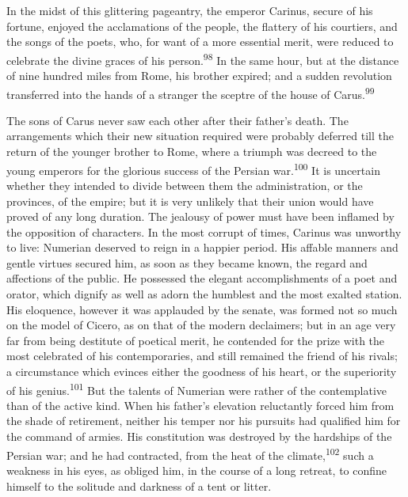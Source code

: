 

In the midst of this glittering pageantry, the emperor Carinus,
secure of his fortune, enjoyed the acclamations of the people,
the flattery of his courtiers, and the songs of the poets, who,
for want of a more essential merit, were reduced to celebrate the
divine graces of his person.\textsuperscript{98} In the same hour, but at the
distance of nine hundred miles from Rome, his brother expired;
and a sudden revolution transferred into the hands of a stranger
the sceptre of the house of Carus.\textsuperscript{99}



The sons of Carus never saw each other after their father’s
death. The arrangements which their new situation required were
probably deferred till the return of the younger brother to Rome,
where a triumph was decreed to the young emperors for the
glorious success of the Persian war.\textsuperscript{100} It is uncertain whether
they intended to divide between them the administration, or the
provinces, of the empire; but it is very unlikely that their
union would have proved of any long duration. The jealousy of
power must have been inflamed by the opposition of characters. In
the most corrupt of times, Carinus was unworthy to live: Numerian
deserved to reign in a happier period. His affable manners and
gentle virtues secured him, as soon as they became known, the
regard and affections of the public. He possessed the elegant
accomplishments of a poet and orator, which dignify as well as
adorn the humblest and the most exalted station. His eloquence,
however it was applauded by the senate, was formed not so much on
the model of Cicero, as on that of the modern declaimers; but in
an age very far from being destitute of poetical merit, he
contended for the prize with the most celebrated of his
contemporaries, and still remained the friend of his rivals; a
circumstance which evinces either the goodness of his heart, or
the superiority of his genius.\textsuperscript{101} But the talents of Numerian
were rather of the contemplative than of the active kind. When
his father’s elevation reluctantly forced him from the shade of
retirement, neither his temper nor his pursuits had qualified him
for the command of armies. His constitution was destroyed by the
hardships of the Persian war; and he had contracted, from the
heat of the climate,\textsuperscript{102} such a weakness in his eyes, as obliged
him, in the course of a long retreat, to confine himself to the
solitude and darkness of a tent or litter.

